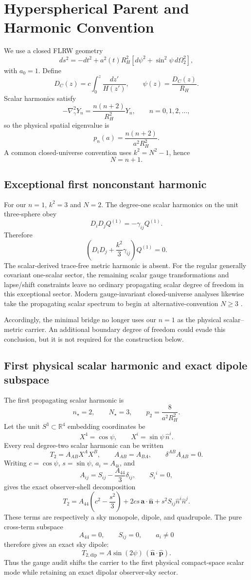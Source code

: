 \section{Hyperspherical Parent and Harmonic Convention}

We use a closed FLRW geometry
\[
ds^2=-dt^2+a^2(t)R_H^2\left[d\psi^2+\sin^2\psi\,d\Omega_2^2\right],
\]
with \(a_0=1\). Define
\[
D_C(z)=c\int_0^z\frac{dz'}{H(z')},
\qquad
\psi(z)=\frac{D_C(z)}{R_H}.
\]
Scalar harmonics satisfy
\[
-\nabla_\gamma^2Y_n=\frac{n(n+2)}{R_H^2}Y_n,
\qquad n=0,1,2,\ldots,
\]
so the physical spatial eigenvalue is
\[
p_n(a)=\frac{n(n+2)}{a^2R_H^2}.
\]
A common closed-universe convention uses \(k^2=N^2-1\), hence
\[
\boxed{N=n+1}.
\]

\subsection{Exceptional first nonconstant harmonic}
For our \(n=1\), \(k^2=3\) and \(N=2\). The degree-one scalar harmonics on the unit three-sphere obey
\[
D_iD_jQ^{(1)}=-\gamma_{ij}Q^{(1)}.
\]
Therefore
\[
\left(D_iD_j+\frac{k^2}{3}\gamma_{ij}\right)Q^{(1)}=0.
\]
The scalar-derived trace-free metric harmonic is absent. For the regular generally covariant one-scalar sector, the remaining scalar gauge transformations and lapse/shift constraints leave no ordinary propagating scalar degree of freedom in this exceptional sector. Modern gauge-invariant closed-universe analyses likewise take the propagating scalar spectrum to begin at alternative-convention \(N\ge3\) \citep{KieferVardanyan2022,SpecognaEtAl2026}.

Accordingly, the minimal bridge no longer uses our \(n=1\) as the physical scalar--metric carrier. An additional boundary degree of freedom could evade this conclusion, but it is not required for the construction below.

\subsection{First physical scalar harmonic and exact dipole subspace}
The first propagating scalar harmonic is
\[
\boxed{n_\star=2},\qquad \boxed{N_\star=3},
\qquad p_2=\frac{8}{a^2R_H^2}.
\]
Let the unit \(S^3\subset\mathbb R^4\) embedding coordinates be
\[
X^4=\cos\psi,\qquad X^i=\sin\psi\,\hat n^i.
\]
Every real degree-two scalar harmonic can be written
\[
T_2=A_{AB}X^AX^B,
\qquad A_{AB}=A_{BA},\qquad \delta^{AB}A_{AB}=0.
\]
Writing \(c=\cos\psi\), \(s=\sin\psi\), \(a_i=A_{4i}\), and
\[
A_{ij}=S_{ij}-\frac{A_{44}}{3}\delta_{ij},\qquad S_i{}^i=0,
\]
gives the exact observer-shell decomposition
\[
\boxed{
T_2=A_{44}\left(c^2-\frac{s^2}{3}\right)
+2cs\,\mathbf a\!\cdot\!\hat{\mathbf n}
+s^2S_{ij}\hat n^i\hat n^j .
}
\]
These terms are respectively a sky monopole, dipole, and quadrupole. The pure cross-term subspace
\[
A_{44}=0,\qquad S_{ij}=0,\qquad a_i\ne0
\]
therefore gives an exact sky dipole:
\[
\boxed{
T_{2,\mathrm{dip}}=A\sin(2\psi)\,(\hat{\mathbf n}\!\cdot\!\hat{\mathbf p}).
}
\]
Thus the gauge audit shifts the carrier to the first physical compact-space scalar mode while retaining an exact dipolar observer-sky sector.

